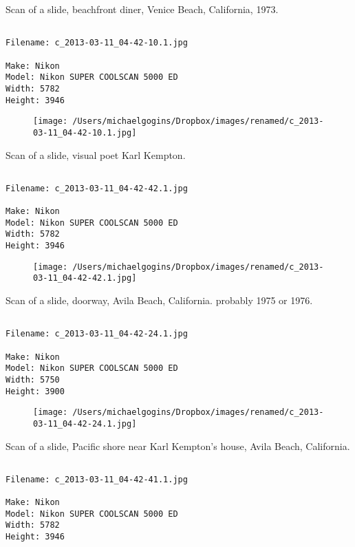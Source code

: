 \clearpage
\onecolumn
\noindent Scan of a slide, beachfront diner, Venice Beach, California, 1973.
\noindent
\begin{lstlisting}

Filename: c_2013-03-11_04-42-10.1.jpg

Make: Nikon
Model: Nikon SUPER COOLSCAN 5000 ED
Width: 5782
Height: 3946
\end{lstlisting}
\clearpage

\begin{figure}
\texttt{[image: /Users/michaelgogins/Dropbox/images/renamed/c\_2013-03-11\_04-42-10.1.jpg]}
\end{figure}
    
\clearpage
\onecolumn
\noindent Scan of a slide, visual poet Karl Kempton.
\noindent
\begin{lstlisting}

Filename: c_2013-03-11_04-42-42.1.jpg

Make: Nikon
Model: Nikon SUPER COOLSCAN 5000 ED
Width: 5782
Height: 3946
\end{lstlisting}
\clearpage

\begin{figure}
\texttt{[image: /Users/michaelgogins/Dropbox/images/renamed/c\_2013-03-11\_04-42-42.1.jpg]}
\end{figure}
    
\clearpage
\onecolumn
\noindent Scan of a slide, doorway, Avila Beach, California. probably 1975 or 1976.
\noindent
\begin{lstlisting}

Filename: c_2013-03-11_04-42-24.1.jpg

Make: Nikon
Model: Nikon SUPER COOLSCAN 5000 ED
Width: 5750
Height: 3900
\end{lstlisting}
\clearpage

\begin{figure}
\texttt{[image: /Users/michaelgogins/Dropbox/images/renamed/c\_2013-03-11\_04-42-24.1.jpg]}
\end{figure}
    
\clearpage
\onecolumn
\noindent Scan of a slide, Pacific shore near Karl Kempton's house, Avila Beach, California.
\noindent
\begin{lstlisting}

Filename: c_2013-03-11_04-42-41.1.jpg

Make: Nikon
Model: Nikon SUPER COOLSCAN 5000 ED
Width: 5782
Height: 3946
\end{lstlisting}
\clearpage

